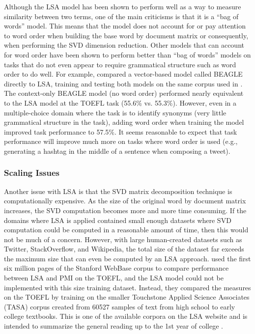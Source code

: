 \documentclass[man,floatsintext,donotrepeattitle]{apa6}
\begin{document}
Although the LSA model has been shown to perform well as a way to measure similarity between two terms, one of the main criticisms is that it is a ``bag of words'' model.
This means that the model does not account for or pay attention to word order when building the base word by document matrix or consequently, when performing the SVD dimension reduction.
Other models that can account for word order have been shown to perform better than ``bag of words'' models on tasks that do not even appear to require grammatical structure such as word order to do well.
For example, \textcite{Jones2007} compared a vector-based model called BEAGLE directly to LSA, training and testing both models on the same corpus used in \textcite{Landauer1997}.
The context-only BEAGLE model (no word order) performed nearly equivalent to the LSA model at the TOEFL task (\num{55.6}\% vs. \num{55.3}\%).
However, even in a multiple-choice domain where the task is to identify synonyms (very little grammatical structure in the task), adding word order when training the model improved task performance to \num{57.5}\%.
It seems reasonable to expect that task performance will improve much more on tasks where word order is used (e.g., generating a hashtag in the middle of a sentence when composing a tweet).

\subsubsection{Scaling Issues}

Another issue with LSA is that the SVD matrix decomposition technique is computationally expensive.
As the size of the original word by document matrix increases, the SVD computation becomes more and more time consuming.
If the domains where LSA is applied contained small enough datasets where SVD computation could be computed in a reasonable amount of time, then this would not be much of a concern.
However, with large human-created datasets such as Twitter, StackOverflow, and Wikipedia, the total size of the dataset far exceeds the maximum size that can even be computed by an LSA approach.
\textcite{Budiu2007} used the first six million pages of the Stanford WebBase corpus to compare performance between LSA and PMI on the TOEFL, and the LSA model could not be implemented with this size training dataset.
Instead, they compared the measures on the TOEFL by training on the smaller Touchstone Applied Science Associates (TASA) corpus created from \num{60527} samples of text from high school to early college textbooks.
This is one of the available corpora on the LSA website and is intended to summarize the general reading up to the 1st year of college \parencite{Budiu2007}.
\end{document}
